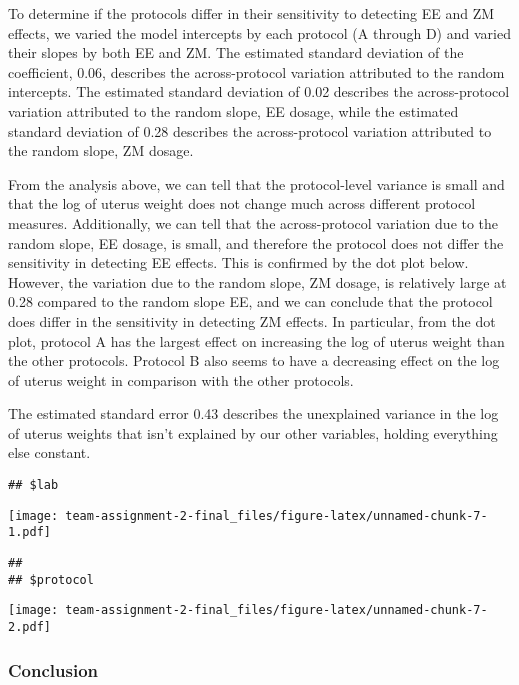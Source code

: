 \documentclass[
]{article}
\begin{document}
To determine if the protocols differ in their sensitivity to detecting
EE and ZM effects, we varied the model intercepts by each protocol (A
through D) and varied their slopes by both EE and ZM. The estimated
standard deviation of the coefficient, 0.06, describes the
across-protocol variation attributed to the random intercepts. The
estimated standard deviation of 0.02 describes the across-protocol
variation attributed to the random slope, EE dosage, while the estimated
standard deviation of 0.28 describes the across-protocol variation
attributed to the random slope, ZM dosage.

From the analysis above, we can tell that the protocol-level variance is
small and that the log of uterus weight does not change much across
different protocol measures. Additionally, we can tell that the
across-protocol variation due to the random slope, EE dosage, is small,
and therefore the protocol does not differ the sensitivity in detecting
EE effects. This is confirmed by the dot plot below. However, the
variation due to the random slope, ZM dosage, is relatively large at
0.28 compared to the random slope EE, and we can conclude that the
protocol does differ in the sensitivity in detecting ZM effects. In
particular, from the dot plot, protocol A has the largest effect on
increasing the log of uterus weight than the other protocols. Protocol B
also seems to have a decreasing effect on the log of uterus weight in
comparison with the other protocols.

The estimated standard error 0.43 describes the unexplained variance in
the log of uterus weights that isn't explained by our other variables,
holding everything else constant.

\begin{verbatim}
## $lab
\end{verbatim}

\texttt{[image: team-assignment-2-final\_files/figure-latex/unnamed-chunk-7-1.pdf]}

\begin{verbatim}
## 
## $protocol
\end{verbatim}

\texttt{[image: team-assignment-2-final\_files/figure-latex/unnamed-chunk-7-2.pdf]}

\hypertarget{conclusion}{%
\subsubsection{Conclusion}\label{conclusion}}
\end{document}
